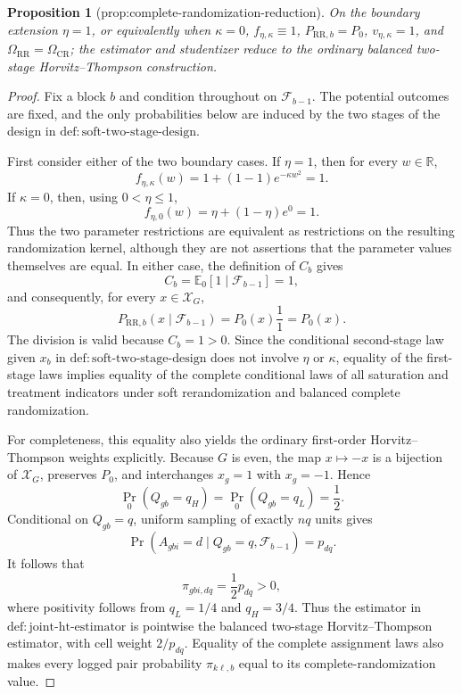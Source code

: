 \documentclass{article}
\newtheorem{proposition}{Proposition}
\begin{document}
\begin{proposition}[prop:complete-randomization-reduction]\label{prop:complete-randomization-reduction}
On the boundary extension \(\eta=1\), or equivalently when \(\kappa=0\), \(f_{\eta,\kappa}\equiv1\), \(P_{\mathrm{RR},b}=P_0\), \(v_{\eta,\kappa}=1\), and \(\Omega_{\mathrm{RR}}=\Omega_{\mathrm{CR}}\); the estimator and studentizer reduce to the ordinary balanced two-stage Horvitz--Thompson construction.
\end{proposition}
\begin{proof}
Fix a block \(b\) and condition throughout on \(\mathcal F_{b-1}\).  The potential outcomes are fixed, and the only probabilities below are induced by the two stages of the design in \(\mathrm{def:soft\mbox{-}two\mbox{-}stage\mbox{-}design}\).

First consider either of the two boundary cases.  If \(\eta=1\), then for every \(w\in\mathbb R\),
\[
 f_{\eta,\kappa}(w)=1+(1-1)e^{-\kappa w^2}=1.
\]
If \(\kappa=0\), then, using \(0<\eta\leq1\),
\[
 f_{\eta,0}(w)=\eta+(1-\eta)e^0=1.
\]
Thus the two parameter restrictions are equivalent as restrictions on the resulting randomization kernel, although they are not assertions that the parameter values themselves are equal.  In either case, the definition of \(C_b\) gives
\[
 C_b=\mathbb E_0[1\mid\mathcal F_{b-1}]=1,
\]
and consequently, for every \(x\in\mathcal X_G\),
\[
 P_{\mathrm{RR},b}(x\mid\mathcal F_{b-1})
 =P_0(x)\frac{1}{1}=P_0(x).
\]
The division is valid because \(C_b=1>0\).  Since the conditional second-stage law given \(x_b\) in \(\mathrm{def:soft\mbox{-}two\mbox{-}stage\mbox{-}design}\) does not involve \(\eta\) or \(\kappa\), equality of the first-stage laws implies equality of the complete conditional laws of all saturation and treatment indicators under soft rerandomization and balanced complete randomization.

For completeness, this equality also yields the ordinary first-order Horvitz--Thompson weights explicitly.  Because \(G\) is even, the map \(x\mapsto-x\) is a bijection of \(\mathcal X_G\), preserves \(P_0\), and interchanges \(x_g=1\) with \(x_g=-1\).  Hence
\[
 \Pr_0(Q_{gb}=q_H)=\Pr_0(Q_{gb}=q_L)=\frac12.
\]
Conditional on \(Q_{gb}=q\), uniform sampling of exactly \(nq\) units gives
\[
 \Pr(A_{gbi}=d\mid Q_{gb}=q,\mathcal F_{b-1})=p_{dq}.
\]
It follows that
\[
 \pi_{gbi,dq}=\frac12p_{dq}>0,
\]
where positivity follows from \(q_L=1/4\) and \(q_H=3/4\).  Thus the estimator in \(\mathrm{def:joint\mbox{-}ht\mbox{-}estimator}\) is pointwise the balanced two-stage Horvitz--Thompson estimator, with cell weight \(2/p_{dq}\).  Equality of the complete assignment laws also makes every logged pair probability \(\pi_{k\ell,b}\) equal to its complete-randomization value.


\end{proof}
\end{document}
